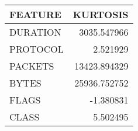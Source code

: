 \begin{tabular}{lr}
\toprule
 FEATURE &     KURTOSIS \\
\midrule
DURATION &  3035.547966 \\
PROTOCOL &     2.521929 \\
 PACKETS & 13423.894329 \\
   BYTES & 25936.752752 \\
   FLAGS &    -1.380831 \\
   CLASS &     5.502495 \\
\bottomrule
\end{tabular}

